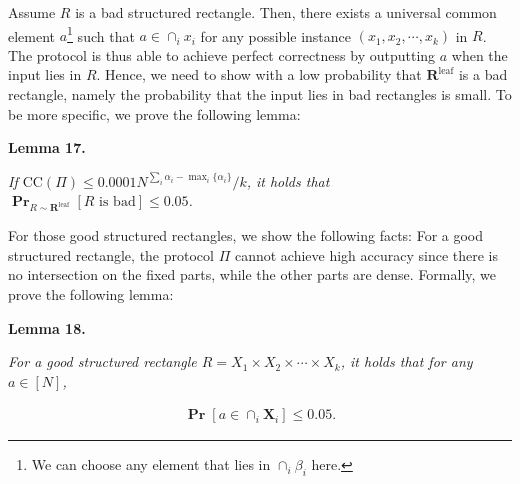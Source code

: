 Assume $R$ is a bad structured rectangle. Then, there exists a universal common element $a$\footnote{We can choose any element that lies in $\cap_{i}\beta_{i}$ here.} such that $a\in\cap_{i}x_{i}$ for any possible instance $(x_{1},x_{2},\cdots,x_{k})$ in $R$. The protocol is thus able to achieve perfect correctness by outputting $a$ when the input lies in $R$. Hence, we need to show with a low probability that $\bm{R}^{\text{leaf}}$ is a bad rectangle, namely the probability that the input lies in bad rectangles is small. To be more specific, we prove the following lemma:\par





\par\medskip\noindent\textbf{
\textbf{Lemma 17}\textbf{.}
}\par



\emph{If $\text{CC}(\Pi)\leq 0.0001N^{\sum_{i}{\alpha_{i}}-\mathop{\max}_{i}\{\alpha_{i}\}}/k$, it holds that
$\operatorname*{\mathbf{Pr}}_{R\sim\bm{R}^{\text{leaf}}}[R\text{ is bad}]\leq 0.05$.}\par






For those good structured rectangles, we show the following facts:
For a good structured rectangle, the protocol $\Pi$ cannot achieve high accuracy since there is no intersection on the fixed parts, while the other parts are dense.
Formally, we prove the following lemma:\par





\par\medskip\noindent\textbf{
\textbf{Lemma 18}\textbf{.}
}\par



\emph{For a good structured rectangle $R=X_{1}\times X_{2}\times\cdots\times X_{k}$,
it holds that for any $a\in[N]$,}\par


\[\begin{gathered}
\operatorname*{\mathbf{Pr}}[a\in\cap_{i}\bm{X}_{i}]\leq 0.05.
\end{gathered}\]






